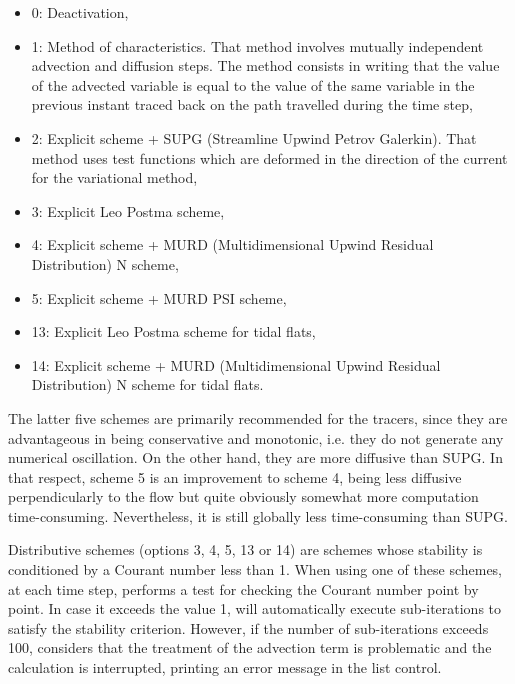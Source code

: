 \begin{itemize}
\item 0: Deactivation,

\item 1: Method of characteristics. That method involves mutually independent
advection and diffusion steps. The method consists in writing that the value of
the advected variable is equal to the value of the same variable in the
previous instant traced back on the path travelled during the time step,

\item 2: Explicit scheme + SUPG (Streamline Upwind Petrov Galerkin). That
method uses test functions which are deformed in the direction of the current
for the variational method,

\item 3: Explicit Leo Postma scheme,

\item 4: Explicit scheme + MURD (Multidimensional Upwind Residual
Distribution) N scheme,

\item 5: Explicit scheme + MURD PSI scheme,

\item 13: Explicit Leo Postma scheme for tidal flats,

\item 14: Explicit scheme + MURD (Multidimensional Upwind Residual
Distribution) N scheme for tidal flats.
\end{itemize}

The latter five schemes are primarily recommended for the tracers, since they
are advantageous in being conservative and monotonic, i.e. they do not generate
any numerical oscillation. On the other hand, they are more diffusive than
SUPG. In that respect, scheme 5 is an improvement to scheme 4, being less
diffusive perpendicularly to the flow but quite obviously somewhat more
computation time-consuming. Nevertheless, it is still globally less
time-consuming than SUPG.

Distributive schemes (options 3, 4, 5, 13 or 14) are schemes whose stability is
conditioned by a Courant number less than 1. When using one of these schemes,
at each time step,  performs a test for checking the Courant number
point by point. In case it exceeds the value 1,  will automatically
execute sub-iterations to satisfy the stability criterion. However, if the
number of sub-iterations exceeds 100,  considers that the treatment
of the advection term is problematic and the calculation is interrupted,
printing an error message in the list control.

